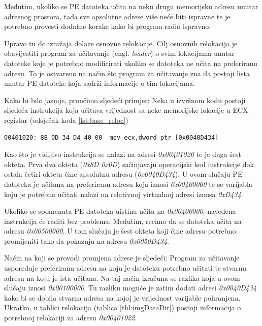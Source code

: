 \documentclass[times, utf8, diplomski, numeric]{fer}
\begin{document}
Međutim, ukoliko se PE datoteka učita na neku drugu memorijsku
adresu unutar adresnog prostora, tada sve apsolutne adrese više
neće biti ispravne te je potrebno provesti dodatne korake kako bi
program radio ispravno. 

Upravo tu do izražaja dolaze osnovne relokacije. Cilj osnovnih
relokacija je obavijestiti program za učitavanje
(engl. \emph{loader}) o svim lokacijama unutar datoteke koje je
potrebno modificirati ukoliko se datoteka ne učita na preferiranu
adresu. To je ostvareno na način što program za učitavanje zna da
postoji lista unutar PE datoteke koja sadrži informacije o tim
lokacijama.

Kako bi bilo jasnije, proučimo sljedeći primjer: Neka u izvršnom
kodu postoji sljedeća instrukcija koja učitava vrijednost sa neke
memorijske lokacije u ECX registar (odsječak koda
\ref{lst:base_reloc})

\begin{lstlisting}[frame=single, caption=Primjer za relokacije, label={lst:base_reloc}]
00401020: 8B 0D 34 D4 40 00  mov ecx,dword ptr [0x0040D434]
\end{lstlisting}

Kao što je vidljivo instrukcija se nalazi na adresi
\emph{0x00401020} te je duga šest okteta. Prva dva okteta
(\emph{0x8D 0x0D}) sačinjavaju operacijski kod instrukcije dok				%
ostala četiri okteta čine apsolutnu adresu (\emph{0x0040D434}). U
ovom slučaju PE datoteka je učitana na preferiranu adresu koja
iznosi \emph{0x00400000} te se varijabla koju je potrebno učitati
nalazi na relativnoj virtualnoj adresi iznosa \emph{0xD434}.

Ukoliko se spomenuta PE datoteka uistinu učita na
\emph{0x00400000}, navedena instrukcija će raditi bez problema.
Međutim, recimo da se datoteka učita na adresu \emph{0x00500000}.
U tom slučaju je šest okteta koji čine adresu potrebno
promijeniti tako da pokazuju na adresu \emph{0x0050D434}.

Način na koji se provodi promjena adrese je sljedeći: Program za
učitavanje uspoređuje preferiranu adresu na koju je datoteku
potrebno učitati te stvarnu adresu na koju je ista učitana. Na
taj način izračuna se razlika koja u ovom slučaju iznosi
\emph{0x00100000}. Tu razliku moguće je zatim dodati adresi
\emph{0x0040D434} kako bi se dobila stvarna adresa na kojoj je
vrijednost varijable pohranjena. Ukratko, u tablici relokacija
(tablica \ref{tbl:imgDataDir}) postoji informacija o potrebnoj
relokaciji za adresu \emph{0x00401022}.
\end{document}
